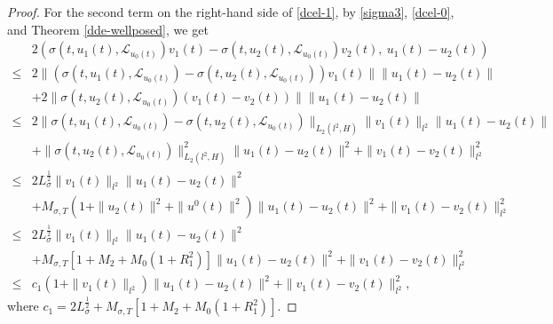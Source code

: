 \documentclass[11pt]{article}
\numberwithin{equation}{section}
\theoremstyle{plain}
\def\leq{\leqslant}
\begin{document}
\begin{proof}
 For the second term on the right-hand side of \eqref{dcel-1},
 by \eqref{sigma3}, \eqref{dcel-0}, and Theorem \ref{dde-wellposed}, we get
\begin{align}\label{dcel-4}
       & 2
           \left(
                  \sigma(t, u_1(t), \mathcal{L}_{u_0(t)} ) v_1(t)
                   - \sigma(t, u_2(t), \mathcal{L}_{u_0(t)} ) v_2(t), \
                  u_1(t) - u_2(t)
           \right)  \nonumber \\
  \leq & 2 \| \left( \sigma(t, u_1(t), \mathcal{L}_{u_0(t)} ) - \sigma(t, u_2(t), \mathcal{L}_{u_0(t)} ) \right) v_1(t) \|
               \| u_1(t) - u_2(t) \|  \nonumber \\
       & + 2 \| \sigma(t, u_2(t), \mathcal{L}_{u_0(t)} ) \left( v_1(t) - v_2(t) \right) \|
                 \| u_1(t) - u_2(t) \|  \nonumber \\
  \leq & 2 \| \sigma(t, u_1(t), \mathcal{L}_{u_0(t)} ) - \sigma(t, u_2(t), \mathcal{L}_{u_0(t)} ) \|_{L_2(l^2, H)}
               \| v_1(t) \|_{l^2}
               \| u_1(t) - u_2(t) \|  \nonumber \\
       & + \| \sigma(t, u_2(t), \mathcal{L}_{u_0(t)} ) \|_{L_2(l^2, H)}^2
           \| u_1(t) - u_2(t) \|^2
         + \| v_1(t) - v_2(t) \|_{l^2}^2
                  \nonumber \\
  \leq & 2 L_{\sigma}^{\frac{1}{2}}
               \| v_1(t) \|_{l^2}
               \| u_1(t) - u_2(t) \|^2  \nonumber \\
       & + M_{\sigma,T}
                       \left( 1 + \| u_2(t) \|^2 + \|u^0(t)\|^2
                       \right)  \| u_1(t) - u_2(t) \|^2
         + \| v_1(t) - v_2(t) \|_{l^2}^2
              \nonumber \\
  \leq & 2 L_{\sigma}^{\frac{1}{2}}
               \| v_1(t) \|_{l^2}
               \| u_1(t) - u_2(t) \|^2  \nonumber \\
       & + M_{\sigma,T}
                       \left[ 1 + M_2 + M_0 \left( 1 + R_1^2 \right)
                       \right]  \| u_1(t) - u_2(t) \|^2
         + \| v_1(t) - v_2(t) \|_{l^2}^2
              \nonumber \\
  \leq & c_1 \left( 1 + \| v_1(t) \|_{l^2} \right) \| u_1(t) - u_2(t) \|^2
         + \| v_1(t) - v_2(t) \|_{l^2}^2,
\end{align}
where
     $ c_1 = 2 L_{\sigma}^{\frac{1}{2}}
             + M_{\sigma,T}
                       \left[ 1 + M_2 + M_0 \left( 1 + R_1^2 \right)
                       \right] $.



\end{proof}
\end{document}
